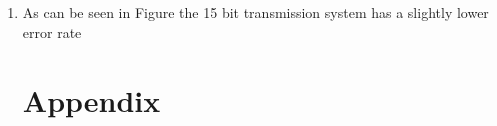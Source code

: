 \documentclass[12pt]{article}
\begin{document}
\begin{enumerate}
\item As can be seen in Figure the 15 bit transmission system has a slightly lower error rate

\clearpage
\section{Appendix}




\inputminted{matlab}{main.m}
    
    
    
    
   
    
    
    
\inputminted{matlab}{Decision.m}


\end{enumerate}
\end{document}
